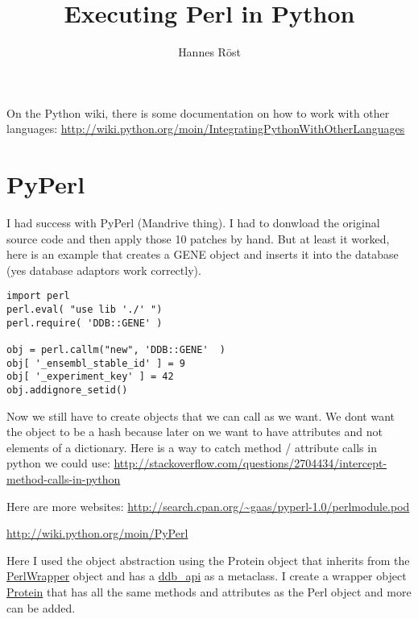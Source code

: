 

\usepackage{gensymb}
\usepackage{hyphenat}
\usepackage{subfig}



\author{Hannes Röst}
\title{Executing Perl in Python}
\maketitle

On the Python wiki, there is some documentation on how to work with
other languages:
\url{http://wiki.python.org/moin/IntegratingPythonWithOtherLanguages}

\section{PyPerl}
I had success with PyPerl (Mandrive thing). I had to donwload the
original source code and then apply those 10 patches by hand. But at
least it worked, here is an example that creates a GENE object and
inserts it into the database (yes database adaptors work correctly).

\begin{verbatim}
import perl
perl.eval( "use lib './' ")
perl.require( 'DDB::GENE' )

obj = perl.callm("new", 'DDB::GENE'  )
obj[ '_ensembl_stable_id' ] = 9
obj[ '_experiment_key' ] = 42
obj.addignore_setid()
\end{verbatim}


Now we still have to create objects that we can call as we want. We dont
want the object to be a hash because later on we want to have attributes
and not elements of a dictionary. Here is a way to catch method /
attribute calls in python we could use:
\url{http://stackoverflow.com/questions/2704434/intercept-method-calls-in-python}

Here are more websites:
\url{http://search.cpan.org/~gaas/pyperl-1.0/perlmodule.pod}

\url{http://wiki.python.org/moin/PyPerl}



\newpage

Here I used the object abstraction using the Protein object that inherits from
the \url{PerlWrapper} object and has a \url{ddb_api} as a metaclass. I create
a wrapper object \url{Protein} that has all the same methods and attributes as
the Perl object and more can be added.


